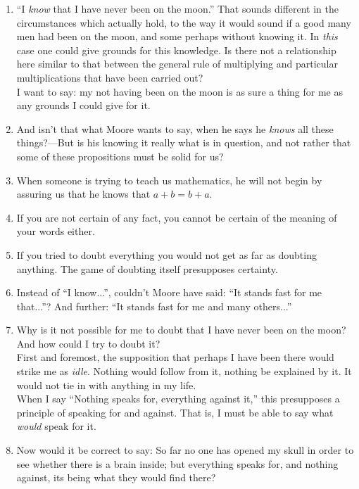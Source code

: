 \documentclass{book}
\begin{document}
\begin{enumerate}
\item
``I \emph{know} that I have never been on the moon.'' That sounds different in the
circumstances which actually hold, to the way it would sound if a good many men
had been on the moon, and some perhaps without knowing it. In \emph{this} case
one could give grounds for this knowledge. Is there not a relationship here
similar to that between the general rule of multiplying and particular
multiplications that have been carried out? \\
I want to say: my not having been on the moon is as sure a thing for me as any
grounds I could give for it.

\item
And isn't that what Moore wants to say, when he says he \emph{knows} all these
things?---But is his knowing it really what is in question, and not rather that
some of these propositions must be solid for us?

\item
When someone is trying to teach us mathematics, he will not begin by assuring
us that he knows that $a+b=b+a$.

\item
If you are not certain of any fact, you cannot be certain of the meaning of
your words either.

\item
If you tried to doubt everything you would not get as far as doubting anything.
The game of doubting itself presupposes certainty.

\item
Instead of ``I know...'', couldn't Moore have said: ``It stands fast for me
that...''? And further: ``It stands fast for me and many others...''

\item
Why is it not possible for me to doubt that I have never been on the moon? And
how could I try to doubt it? \\
First and foremost, the supposition that perhaps I have been there would strike
me as \emph{idle}. Nothing would follow from it, nothing be explained by it. It
would not tie in with anything in my life. \\
When I say ``Nothing speaks for, everything against it,'' this presupposes a
principle of speaking for and against. That is, I must be able to say what
\emph{would} speak for it.

\item
Now would it be correct to say: So far no one has opened my skull in order to
see whether there is a brain inside; but everything speaks for, and nothing
against, its being what they would find there?


\end{enumerate}
\end{document}
